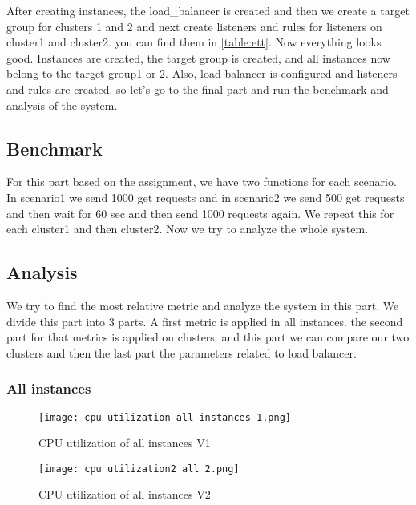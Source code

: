 \documentclass[12pt]{article}
\begin{document}
        After creating instances, the load_balancer is created and then we create a target group for clusters 1 and 2 and next create listeners and rules for listeners on cluster1 and cluster2. you can find them in \ref{table:ett}. Now everything looks good. Instances are created, the target group is created, and all instances now belong to the target group1 or 2. Also, load balancer is configured and listeners and rules are created. so let's go to the final part and run the benchmark and analysis of the system.

        \subsection{Benchmark}
         For this part based on the assignment, we have two functions for each scenario. In scenario1 we send 1000 get requests and in scenario2 we send 500 get requests and then wait for 60 sec and then send 1000 requests again. We repeat this for each cluster1 and then cluster2. Now we try to analyze the whole system. 

         \subsection{Analysis}
            We try to find the most relative metric and analyze the system in this part. We divide this part into 3 parts. A first metric is applied in all instances. the second part for that metrics is applied on clusters. and this part we can compare our two clusters and then the last part the parameters related to load balancer.

        

        \subsubsection{All instances}

          \begin{figure}[htpb]
        \centering
        \texttt{[image: cpu utilization all instances 1.png]}
            \caption*\small{CPU utilization of all instances V1}
            \label{fig:cpu1}
        \end{figure}

         \begin{figure}[htpb]
        \centering
        \texttt{[image: cpu utilization2 all 2.png]}
            \caption*\small{CPU utilization of all instances V2}
            \label{fig:cpu2}
        \end{figure}
\end{document}
